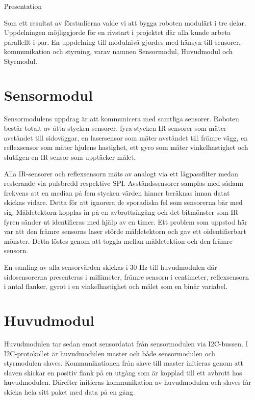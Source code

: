 \documentclass[10pt]{article}
\begin{document}
\begin{center}
\Huge Presentation
\end{center}

Som ett resultat av förstudierna valde vi att bygga roboten modulärt i tre delar. Uppdelningen möjliggjorde för en rivstart i projektet där alla kunde arbeta parallellt i par. En uppdelning till modulnivå gjordes med hänsyn till sensorer, kommunikation och styrning, varav namnen Sensormodul, Huvudmodul och Styrmodul. 

\section{Sensormodul}
Sensormodulens uppdrag är att kommunicera med samtliga sensorer. Roboten består totalt av åtta stycken sensorer, fyra stycken IR-sensorer som mäter avståndet till sidoväggar, en lasersensor som mäter avståndet till främre vägg, en reflexsensor som mäter hjulens hastighet, ett gyro som mäter vinkelhastighet och slutligen en IR-sensor som upptäcker målet. 

Alla IR-sensorer och reflexsensorn mäts av analogt via ett lågpassfilter medan resterande via pulsbredd respektive SPI. Avståndssensorer samplas med sådann frekvens att en median på fem stycken värden hinner beräknas innan datat skickas vidare. Detta för att ignorera de sporadiska fel som sensorerna bär med sig. Måldetektorn kopplas in på en avbrottsingång och det bitmönster som IR-fyren sänder ut identifieras med hjälp av en timer. Ett problem som uppstod här var att den främre sensorns laser störde måldetektorn och gav ett oidentifierbart mönster. Detta löstes genom att toggla mellan måldetektion och den främre sensorn. 

En samling av alla sensorvärden skickas i 30 Hz till huvudmodulen där sidosensorerna presenteras i millimeter, främre sensorn i centimeter, reflexsensorn i antal flanker, gyrot i en vinkelhastighet och målet som en binär variabel. 

\section{Huvudmodul}
Huvudmodulen tar sedan emot sensordatat från sensormodulen via I2C-bussen. I I2C-protokollet är huvudmodulen master och både sensormodulen och styrmodulen slaves. Kommunikationen från slave till master initieras genom att slaven skickar en positiv flank på en utgång som är kopplad till ett avbrott hos huvudmodulen. Därefter initieras kommunikation av huvudmodulen och slaves får skicka hela sitt paket med data på en gång. 
\end{document}
